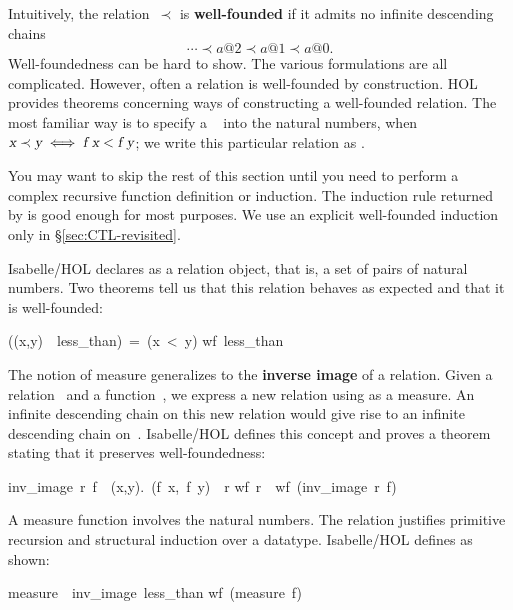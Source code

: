 Intuitively, the relation~$\prec$ is \textbf{well-founded} if it admits no
infinite  descending chains
\[ \cdots \prec a@2 \prec a@1 \prec a@0. \]
Well-foundedness can be hard to show. The various 
formulations are all complicated.  However,  often a relation
is well-founded by construction.  HOL provides
theorems concerning ways of constructing  a well-founded relation.  The
most familiar way is to specify a ~ into
the natural numbers, when $\emph{\sl x}\prec \emph{\sl y}\iff \emph{\sl f x} < \emph{\sl f y}$;
we write this particular relation as
.

\begin{warn}
You may want to skip the rest of this section until you need to perform a
complex recursive function definition or induction.  The induction rule
returned by
 is good enough for most purposes.  We use an explicit
well-founded induction only in \S\ref{sec:CTL-revisited}.
\end{warn}

Isabelle/HOL declares  as a relation object, 
that is, a set of pairs of natural numbers. Two theorems tell us that this
relation  behaves as expected and that it is well-founded: 
\begin{isabelle}
((x,y)\ \isasymin\ less_than)\ =\ (x\ <\ y)
\isanewline
wf\ less_than
\end{isabelle}

The notion of measure generalizes to the 
\textbf{inverse image} of
a relation. Given a relation~ and a function~, we express  a
new relation using  as a measure.  An infinite descending chain on
this new relation would give rise to an infinite descending chain
on~.  Isabelle/HOL defines this concept and proves a
theorem stating that it preserves well-foundedness: 
\begin{isabelle}
inv_image\ r\ f\ \isasymequiv\ \isacharbraceleft(x,y).\ (f\ x,\ f\ y)\
\isasymin\ r\isacharbraceright
{}\isanewline
wf\ r\ \isasymLongrightarrow\ wf\ (inv_image\ r\ f)
\end{isabelle}

A measure function involves the natural numbers.  The relation \isa{measure
size} justifies primitive recursion and structural induction over a
datatype.  Isabelle/HOL defines
 as shown: 
\begin{isabelle}
measure\ \isasymequiv\ inv_image\ less_than%
\isanewline
wf\ (measure\ f)
\end{isabelle}

